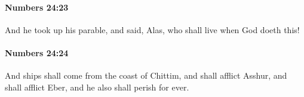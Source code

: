 		\paragraph{Numbers 24:23} %
			\label{NUMBERS-24-23}

			And he took up his parable, and said, Alas, who shall live when God doeth this!


		\paragraph{Numbers 24:24} %
			\label{NUMBERS-24-24}

			And ships shall come from the coast of Chittim, and shall afflict Asshur, and shall afflict Eber, and he also shall perish for ever.


